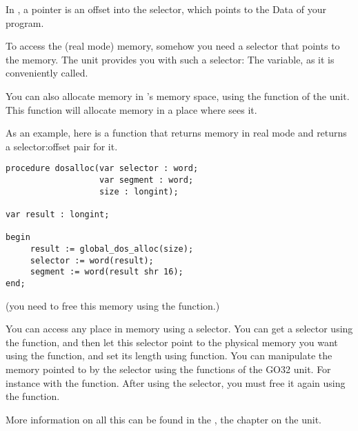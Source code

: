 \documentclass{report}
\begin{document}
In \fpc, a pointer is an offset into the  selector, which points to
the Data of your program.

To access the (real mode) \dos memory, somehow you need a selector that 
points to the \dos memory. 
The  unit provides you with such a selector: The
 variable, as it is conveniently called.

You can also allocate memory in \dos's memory space, using the
 function of the  unit. 
This function will allocate memory in a place where \dos sees it.

As an example, here is a function that returns memory in real mode \dos and
returns a selector:offset pair for it.
\begin{verbatim}
procedure dosalloc(var selector : word; 
                   var segment : word; 
                   size : longint);

var result : longint;

begin
     result := global_dos_alloc(size);
     selector := word(result);
     segment := word(result shr 16);
end; 
\end{verbatim}
(you need to free this memory using the  function.)

You can access any place in memory using a selector. You can get a selector
using the  function, and then let this selector
point to the physical memory you want using the
 function, and set its length using
 function. 
You can manipulate the memory pointed to by the selector using the functions
of the GO32 unit. For instance with the  function.
After using the selector, you must free it again using the 
 function.

More information on all this can be found in the \unitsref, the chapter on
the  unit. 

\appendix

\end{document}
